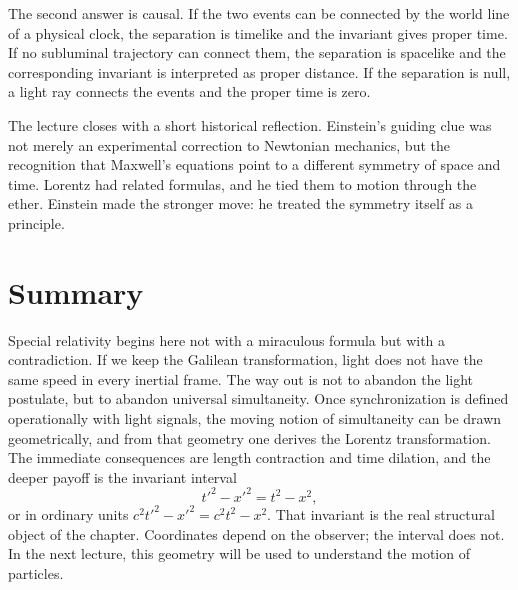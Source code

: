 The second answer is causal. If the two events can be connected by the world line of a physical clock, the separation is timelike and the invariant gives proper time. If no subluminal trajectory can connect them, the separation is spacelike and the corresponding invariant is interpreted as proper distance. If the separation is null, a light ray connects the events and the proper time is zero.

The lecture closes with a short historical reflection. Einstein's guiding clue was not merely an experimental correction to Newtonian mechanics, but the recognition that Maxwell's equations point to a different symmetry of space and time. Lorentz had related formulas, and he tied them to motion through the ether. Einstein made the stronger move: he treated the symmetry itself as a principle.

\section{Summary}

Special relativity begins here not with a miraculous formula but with a contradiction. If we keep the Galilean transformation, light does not have the same speed in every inertial frame. The way out is not to abandon the light postulate, but to abandon universal simultaneity. Once synchronization is defined operationally with light signals, the moving notion of simultaneity can be drawn geometrically, and from that geometry one derives the Lorentz transformation. The immediate consequences are length contraction and time dilation, and the deeper payoff is the invariant interval
\begin{equation}
t'^2-x'^2=t^2-x^2,
\end{equation}
or in ordinary units \(c^2t'^2-x'^2=c^2t^2-x^2\). That invariant is the real structural object of the chapter. Coordinates depend on the observer; the interval does not. In the next lecture, this geometry will be used to understand the motion of particles.